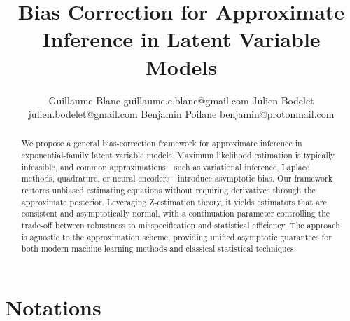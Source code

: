 \documentclass[twoside,11pt]{article}
\begin{document}
\title{Bias Correction for Approximate Inference in Latent Variable Models}

\author{\name Guillaume Blanc \email guillaume.e.blanc@gmail.com
  \AND
  \name Julien Bodelet \email julien.bodelet@gmail.com
  \AND
  \name Benjamin Poilane \email benjamin@protonmail.com
}

\editor{} %

\maketitle

\begin{abstract}
We propose a general bias-correction framework for approximate inference in exponential-family latent variable models. Maximum likelihood estimation is typically infeasible, and common approximations—such as variational inference, Laplace methods, quadrature, or neural encoders—introduce asymptotic bias. Our framework restores unbiased estimating equations without requiring derivatives through the approximate posterior. Leveraging Z-estimation theory, it yields estimators that are consistent and asymptotically normal, with a continuation parameter controlling the trade-off between robustness to misspecification and statistical efficiency. The approach is agnostic to the approximation scheme, providing unified asymptotic guarantees for both modern machine learning methods and classical statistical techniques.
\end{abstract}



\newpage

\listoftodos
\newpage

\section{Notations}

\newpage
\end{document}
